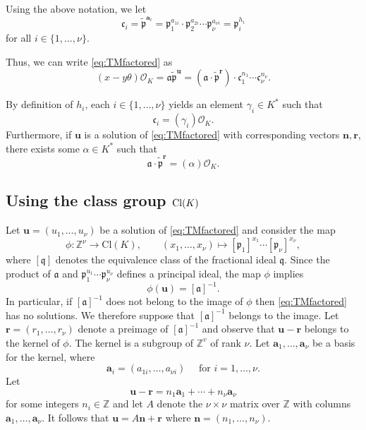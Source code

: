 Using the above notation, we let
\[\mathfrak{c}_i = \tilde{\mathfrak{p}}^{\mathbf{a}_i}=\mathfrak{p}_1^{a_{1i}}\cdot \mathfrak{p}_2^{a_{2i}} \cdots \mathfrak{p}_{\nu}^{a_{{\nu}i}} = \mathfrak{p}_i^{h_i} \]
for all $i \in \{1, \dots, {\nu}\}$.

Thus, we can write \eqref{eq:TMfactored} as
\[ (x-y\theta) \mathcal{O}_K = \mathfrak{a} \tilde{\mathfrak{p}}^{\mathbf{u}}  = (\mathfrak{a} \cdot \tilde{\mathfrak{p}}^\mathbf{r}) \cdot \mathfrak{c}_1^{n_1}\cdots \mathfrak{c}_{\nu}^{n_{\nu}}.\]

By definition of $h_i$, each $i \in \{1, \dots, {\nu}\}$ yields an element $\gamma_i \in K^*$ such that 
\[\mathfrak{c}_i = (\gamma_i) \mathcal{O}_K.\]
Furthermore, if $\mathbf{u}$ is a solution of \eqref{eq:TMfactored} with corresponding vectors $\mathbf{n}, \mathbf{r}$, there exists some $\alpha \in K^*$ such that 
\[\mathfrak{a} \cdot \tilde{\mathfrak{p}}^\mathbf{r}= (\alpha)\mathcal{O}_K.\]


\subsection{Using the class group $\operatorname{Cl}(K)$}
\label{subsec:FactorizationTMwithOK}

Let $\mathbf{u}=(u_1,\dots, u_{\nu})$ be a solution of \eqref{eq:TMfactored} and consider the map
\[\phi : \mathbb{Z}^{\nu} \rightarrow \text{Cl}(K), \qquad (x_1,\dots ,x_{\nu}) \mapsto [\mathfrak{p}_1]^{x_1}\cdots [\mathfrak{p}_{\nu}]^{x_{\nu}},\]
where $[ \mathfrak{q} ]$ denotes the equivalence class of the fractional ideal $\mathfrak{q}$. 
Since the product of $\mathfrak{a}$ and $\mathfrak{p}_1^{u_1}\cdots \mathfrak{p}_{\nu}^{u_{\nu}}$ defines a principal ideal, the map $\phi$ implies
\[\phi(\mathbf{u})=[\mathfrak{a}]^{-1}.\]
In particular, if $[\mathfrak{a}]^{-1}$ does not belong to the image of $\phi$ then \eqref{eq:TMfactored} has no solutions. We therefore suppose that $[\mathfrak{a}]^{-1}$ belongs to the image. Let $\mathbf{r}=(r_1,\dotsc,r_{\nu})$ denote a preimage of $[\mathfrak{a}]^{-1}$ and observe that $\mathbf{u} - \mathbf{r}$ belongs to the kernel of $\phi$. The kernel is a subgroup of $\mathbb{Z}^v$ of rank $\nu$. Let $\mathbf{a}_1,\dots,\mathbf{a}_{\nu}$ be a basis for the kernel, where
\[\mathbf{a}_i = (a_{1i}, \dots, a_{\nu i}) \quad \text{ for } i = 1, \dots, \nu.\]
Let
\[\mathbf{u}-\mathbf{r}=n_1 \mathbf{a}_1+\cdots + n_{\nu} \mathbf{a}_{\nu}\]
for some integers $n_i \in \mathbb{Z}$ and let $A$ denote the $\nu \times \nu$ matrix over $\mathbb{Z}$ with columns $\mathbf{a}_1,\dots,\mathbf{a}_{\nu}$. It follows that $\mathbf{u}= A\mathbf{n}+\mathbf{r}$ where $\mathbf{n} = (n_1,\dots,n_{\nu})$.

